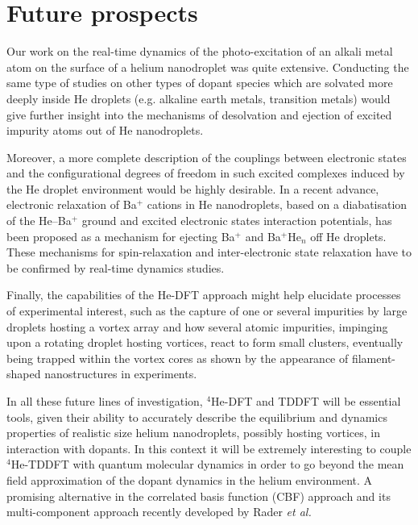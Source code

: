 \section*{Future prospects}
Our work on the real-time dynamics of the photo-excitation of an alkali metal atom on the surface of a helium nanodroplet was quite extensive. Conducting the same type of studies on other types of dopant species which are solvated more deeply inside He droplets (e.g. alkaline earth metals, transition metals) would give further insight into the mechanisms of desolvation and ejection of excited impurity atoms out of He nanodroplets\citep{Loginov:2007,Loginov:2012, Kautsch:2013,Lindebner:2014}.

Moreover, a more complete description of the couplings between electronic states and the configurational degrees of freedom in such excited complexes induced by the He droplet environment would be highly desirable\citep{Closser:2014,Masson:2014}. In a recent advance, electronic relaxation of Ba$^+$ cations in He nanodroplets, based on a diabatisation of the He–Ba$^+$ ground and excited electronic states interaction potentials\citep{Vindel:2018}, has been proposed as a mechanism for ejecting Ba$^+$ and Ba$^+$He$_n$ off He droplets. These mechanisms for spin-relaxation and inter-electronic state relaxation have to be confirmed by real-time dynamics studies.

Finally, the capabilities of the He-DFT approach might help elucidate processes of experimental interest, such as the capture of one or several impurities by large droplets hosting a vortex array and how several atomic impurities, impinging upon a rotating droplet hosting vortices, react to form small clusters, eventually being trapped within the vortex cores as shown by the appearance of filament-shaped nanostructures in experiments.

In all these future lines of investigation, $^4$He-DFT and TDDFT will be essential tools, given their ability to accurately describe the equilibrium and dynamics properties of realistic size helium nanodroplets, possibly hosting vortices, in interaction with dopants. In this context it will be extremely interesting to couple $^4$He-TDDFT with quantum molecular dynamics in order to go beyond the mean field approximation of the dopant dynamics in the helium environment. A promising alternative in the correlated basis function (CBF) approach and its multi-component approach recently developed by Rader \textit{et al.}\citep{Rader2017}
\clearpage{\pagestyle{empty}\cleardoublepage}